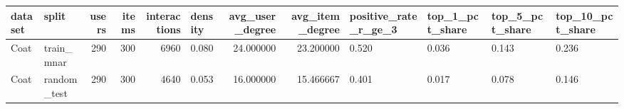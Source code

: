 \begin{tabular}{llrrrlrrllll}
\toprule
dataset & split & users & items & interactions & density & avg_user_degree & avg_item_degree & positive_rate_r_ge_3 & top_1_pct_share & top_5_pct_share & top_10_pct_share \\
\midrule
Coat & train_mnar & 290 & 300 & 6960 & 0.080 & 24.000000 & 23.200000 & 0.520 & 0.036 & 0.143 & 0.236 \\
Coat & random_test & 290 & 300 & 4640 & 0.053 & 16.000000 & 15.466667 & 0.401 & 0.017 & 0.078 & 0.146 \\
\bottomrule
\end{tabular}
